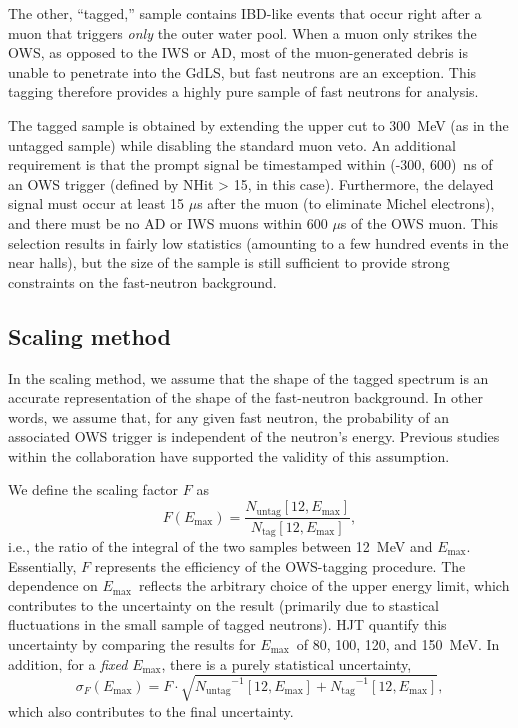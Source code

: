 \documentclass[../thesis.tex]{subfiles}
\begin{document}
The other, ``tagged,'' sample contains IBD-like events that occur right after a muon that triggers \emph{only} the outer water pool. When a muon only strikes the OWS, as opposed to the IWS or AD, most of the muon-generated debris is unable to penetrate into the GdLS, but fast neutrons are an exception. This tagging therefore provides a highly pure sample of fast neutrons for analysis.

The tagged sample is obtained by extending the upper cut to 300~MeV (as in the untagged sample) while disabling the standard muon veto. An additional requirement is that the prompt signal be timestamped within (-300, 600)~ns of an OWS trigger (defined by NHit > 15, in this case). Furthermore, the delayed signal must occur at least 15 $\mu$s after the muon (to eliminate Michel electrons), and there must be no AD or IWS muons within 600 $\mu$s of the OWS muon. This selection results in fairly low statistics (amounting to a few hundred events in the near halls), but the size of the sample is still sufficient to provide strong constraints on the fast-neutron background.

\subsection{Scaling method}
\label{sec:fastn_scaling}

In the scaling method, we assume that the shape of the tagged spectrum is an accurate representation of the shape of the fast-neutron background. In other words, we assume that, for any given fast neutron, the probability of an associated OWS trigger is independent of the neutron's energy. Previous studies within the collaboration have supported the validity of this assumption.

\def\emax{\ensuremath{E_\mathrm{max}}} \def\ntag{\ensuremath{N_\mathrm{tag}}}
\def\nuntag{\ensuremath{N_\mathrm{untag}}}

We define the scaling factor $F$ as \[ F(\emax) = \frac{\nuntag[12, \emax]}{\ntag[12, \emax]}, \] i.e., the ratio of the integral of the two samples between 12~MeV and \emax. Essentially, $F$ represents the efficiency of the OWS-tagging procedure. The dependence on \emax\ reflects the arbitrary choice of the upper energy limit, which contributes to the uncertainty on the result (primarily due to stastical fluctuations in the small sample of tagged neutrons). HJT quantify this uncertainty by comparing the results for \emax\ of 80, 100, 120, and 150~MeV. In addition, for a \emph{fixed} \emax, there is a purely statistical uncertainty,
\[ \sigma_F(\emax) = F \cdot \sqrt{\nuntag^{-1}[12, \emax] + \ntag^{-1}[12,
    \emax]},
\]
which also contributes to the final uncertainty.
\end{document}
